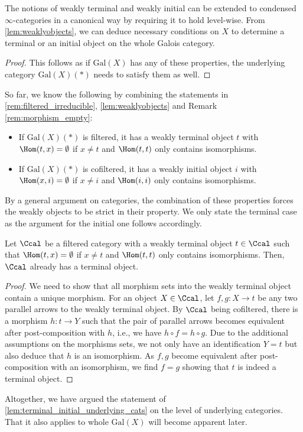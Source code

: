 \documentclass[leqno]{article}
\renewcommand{\Gal}{\mathrm{Gal}}
\begin{document}
The notions of weakly terminal and weakly initial can be extended to condensed $\infty$-categories in a canonical way by requiring it to hold level-wise.
From \cref{lem:weaklyobjects}, we can deduce necessary conditions on $X$ to determine a terminal or an initial object on the whole Galois category.
\begin{proof}
This follows as if $\Gal(X)$ has any of these properties, the underlying category $\Gal(X)(\ast)$ needs to satisfy them as well.
\end{proof}
So far, we know the following by combining the statements in \cref{rem:filtered_irreducible}, \cref{lem:weaklyobjects} and Remark \cref{rem:morphism_empty}:
\begin{itemize}
    \item[a)] If $\Gal(X)(\ast)$ is filtered, it has a weakly terminal object $t$ with $\Hom(t,x)=\emptyset$ if $x\neq t$ and $\Hom(t,t)$ only contains isomorphisms.
    \item[b)] If $\Gal(X)(\ast)$ is cofiltered, it has a weakly initial object $i$ with $\Hom(x,i)=\emptyset$ if $x\neq i$ and $\Hom(i,i)$ only contains isomorphisms.
    \end{itemize}
By a general argument on categories, the combination of these properties forces the weakly objects to be strict in their property.
We only state the terminal case as the argument for the initial one follows accordingly.
\begin{lemma}
Let $\Ccal$ be a filtered category with a weakly terminal object $t\in \Ccal$ such that $\Hom(t,x)=\emptyset$ if $x\neq t$ and $\Hom(t,t)$ only contains isomorphisms.
Then, $\Ccal$ already has a terminal object.
\end{lemma}
\begin{proof}
We need to show that all morphism sets into the weakly terminal object contain a unique morphism.
For an object $X\in \Ccal$, let $f,g\colon X \rightarrow t$ be any two parallel arrows to the weakly terminal object.
By $\Ccal$ being cofiltered, there is a morphism $h\colon t\rightarrow Y$ such that the pair of parallel arrows becomes equivalent after post-composition with $h$, i.e., we have $h\circ f=h\circ g$. Due to the additional assumptions on the morphisms sets, we not only have an identification $Y=t$ but also deduce that $h$ is an isomorphism. As $f,g$ become equivalent after post-composition with an isomorphism, we find $f=g$ showing that $t$ is indeed a terminal object.
\end{proof}
Altogether, we have argued the statement of \cref{lem:terminal_initial_underlying_cats} on the level of underlying categories.
That it also applies to whole $\Gal(X)$ will become apparent later. 
\end{document}
